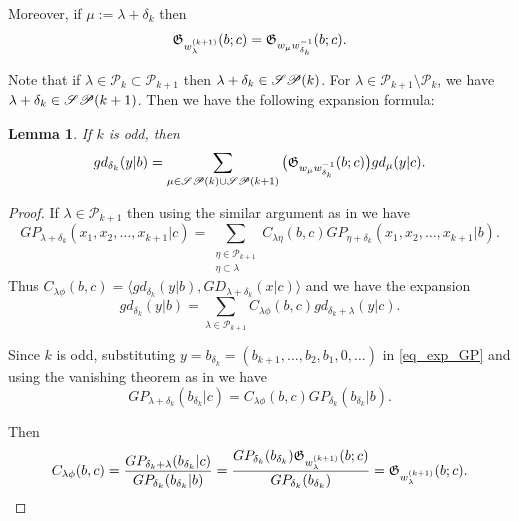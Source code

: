 \documentclass[a4paper]{amsart}
\newtheorem{lem}[thm]{Lemma}
\theoremstyle{remark}
\numberwithin{equation}{section}
\begin{document}
 Moreover, if $\mu:=\lambda+\delta_k$ then
$$\mathfrak{G}_{w_\lambda^{(k+1)}}(b;c)=\mathfrak{G}_{w_\mu w_{\delta_k}^{-1}}(b;c).$$

Note that if $\lambda\in \mathscr{P}_k\subset \mathscr{P}_{k+1}$ then $\lambda+\delta_k\in \mathscr{SP}(k)$. For $\lambda \in \mathscr{P}_{k+1}\setminus\mathscr{P}_{k}$, we have $\lambda+\delta_k\in \mathscr{SP}(k+1)$. Then we have the following expansion formula:



 \begin{lem}\label{lem_odd_k}
 If $k$ is odd, then 
 \begin{equation}\label{eq_odd_k}
gd_{\delta_k}(y| b)=\sum_{\mu\in \mathscr{SP}(k)\cup\mathscr{SP}(k+1)} \big(\mathfrak{G} _{w_{{\mu}}w_{\delta_k}^{-1}}(b;c)\big)gd_{\mu}(y| c). 
 \end{equation}
 \end{lem}
\begin{proof}



If $\lambda\in \mathscr{P}_{k+1}$ then using the similar argument as in \cite[Proposition 3.6]{IN} we have 
\begin{equation}\label{eq_exp_GP}
    GP_{\lambda+\delta_{k}}(x_1,x_2,\dots,x_{k+1}| c)=\sum_{\substack{\eta\in \mathscr{P}_{k+1}\\ \eta\subset \lambda}}C_{\lambda\eta}(b,c)GP_{\eta+\delta_{k}}(x_1,x_2,\dots,x_{k+1}| b).
\end{equation}
Thus $C_{\lambda\phi}(b,c)=\langle gd_{\delta_k}(y| b),GD_{\lambda+\delta_k}(x| c)\rangle$ and we have the expansion
$$gd_{\delta_k}(y| b)=\sum_{\lambda\in \mathscr{P}_{k+1}}C_{\lambda\phi}(b,c)gd_{\delta_k+\lambda}(y| c).$$


Since $k$ is odd, substituting $y=b_{\delta_{k}}=( b_{k+1},\dots,b_2, b_1,0,\dots)$ in \eqref{eq_exp_GP} and using the vanishing theorem as in \cite[Proposition 7.1]{IN} we have
$$GP_{\lambda+\delta_{k}}(b_{\delta_{k}}| c)=C_{\lambda\phi}(b,c)GP_{\delta_{k}}(b_{\delta_{k}}| b).$$

Then $$C_{\lambda\phi}(b,c)=\frac{GP_{\delta_{k}+\lambda}(b_{\delta_{k}}| c)}{GP_{\delta_{k}}(b_{\delta_{k}}| b)}=\frac{GP_{\delta_{k}}(b_{\delta_{k}})\mathfrak{G}_{w_\lambda^{(k+1)}}(b;c)}{GP_{\delta_{k}}(b_{\delta_k})}=\mathfrak{G}_{w_\lambda^{(k+1)}}(b;c).$$
\end{proof}
\end{document}
